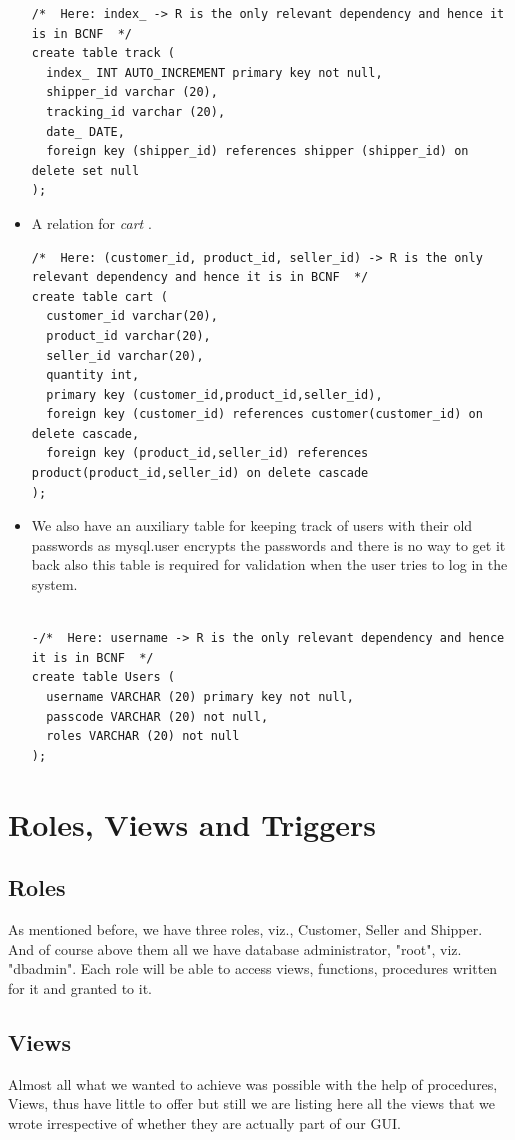 \documentclass[a4paper,12pt]{article}
\newcommand{\ita}[1]{
    \textit{#1}
}
\begin{document}
\begin{itemize}
\begin{verbatim}
/*  Here: index_ -> R is the only relevant dependency and hence it is in BCNF  */
create table track (
  index_ INT AUTO_INCREMENT primary key not null,
  shipper_id varchar (20),
  tracking_id varchar (20),
  date_ DATE,
  foreign key (shipper_id) references shipper (shipper_id) on delete set null
);
  \end{verbatim}
  \item A relation for \ita{cart}.
  \begin{verbatim}
/*  Here: (customer_id, product_id, seller_id) -> R is the only relevant dependency and hence it is in BCNF  */
create table cart (
  customer_id varchar(20),
  product_id varchar(20),
  seller_id varchar(20),
  quantity int,
  primary key (customer_id,product_id,seller_id),
  foreign key (customer_id) references customer(customer_id) on delete cascade,
  foreign key (product_id,seller_id) references product(product_id,seller_id) on delete cascade
);
  \end{verbatim}
  \item We also have an auxiliary table for keeping track of users with their old passwords as mysql.user encrypts the passwords and there is no way to get it back also this table is required for validation when the user tries to log in the system.
  \begin{verbatim}

-/*  Here: username -> R is the only relevant dependency and hence it is in BCNF  */
create table Users (
  username VARCHAR (20) primary key not null,
  passcode VARCHAR (20) not null,
  roles VARCHAR (20) not null
);
  \end{verbatim}
\end{itemize}
\newpage
\section{Roles, Views and Triggers}
\subsection{Roles}
As mentioned before, we have three roles, viz., Customer, Seller and Shipper. And of course above them all we have database administrator, "root", viz. "dbadmin". Each role will be able to access views, functions, procedures written for it and granted to it.
\subsection{Views}
Almost all what we wanted to achieve was possible with the help of procedures, Views, thus have little to offer but still we are listing here all the views that we wrote irrespective of whether they are actually part of our GUI.
\end{document}
